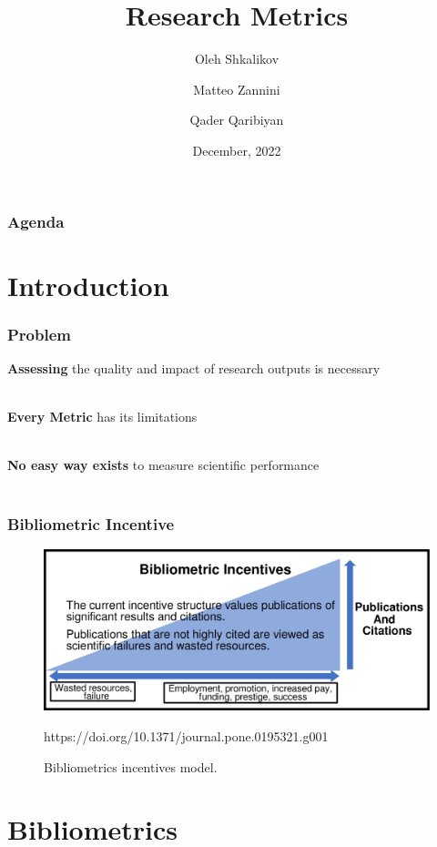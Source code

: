 \documentclass{beamer}
\title[Scientific metrics]{Research Metrics}
\author[O. Shkalikov \and M. Zannini \and Q.Qaribiyan]
{Oleh Shkalikov \and Matteo Zannini \and Qader Qaribiyan}
\institute[]{TU Dresden, Computer Science Faculty}
\date{December, 2022}
\begin{document}
\frame{\titlepage}

\begin{frame}
    \frametitle{Agenda}
    \tableofcontents
\end{frame}

\section{Introduction}

\begin{frame}

    \frametitle{Problem}

    \textbf{Assessing} the quality and impact of research outputs is necessary \\~\



     \textbf{Every Metric} has its limitations\\~\



    \textbf{No easy way exists} to measure scientific performance\\~\


\end{frame}

\begin{frame}

    \frametitle{Bibliometric Incentive}

    \begin{figure}[h]
        \includegraphics[height=0.5\textheight]{1.png}
        \caption{Bibliometrics incentives model.}
        https://doi.org/10.1371/journal.pone.0195321.g001
    \end{figure}

\end{frame}

\section{Bibliometrics}
\end{document}
